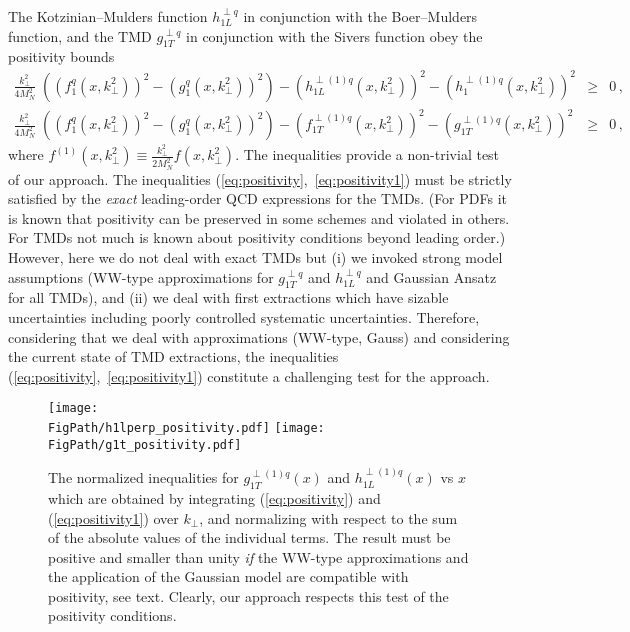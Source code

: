 \documentclass[a4paper,11pt]{article}
\newcommand{\ba}{\begin{eqnarray}}
\newcommand{\ea}{\end{eqnarray}}
\def\kperp{k_\perp}
\newcommand*{\FigPath}{./figs}%
\begin{document}
The Kotzinian--Mulders function $h^{\perp q}_{1L}$ in conjunction with
the Boer--Mulders function, and the TMD $g^{\perp q}_{1T}$ in conjunction
with the Sivers function obey the positivity bounds
\cite{Bacchetta:1999kz}
\begin{subequations}\ba
	\frac{\kperp^2}{4M_N^2}\;
	\left((f_{1}^{q}(x,\kperp^2))^2 -(g_{1}^{q}(x,\kperp^2))^2\right)
	- (h^{\perp(1)q}_{1L}(x,\kperp^2))^2
	- (h_{1}^{\perp(1)q}(x,\kperp^2))^2
	& \ge & 0\,, \quad \label{eq:positivity}\\
	\frac{\kperp^2}{4M_N^2}\;
	\left((f_{1}^{q}(x,\kperp^2))^2 -(g_{1}^{q}(x,\kperp^2))^2\right)
	- (f_{1T}^{\perp(1)q}(x,\kperp^2))^2
	- (g^{\perp(1)q}_{1T}(x,\kperp^2))^2
	& \ge & 0\,, \quad \label{eq:positivity1}
\ea\end{subequations}
where $f^{(1)}(x,\kperp^2) \equiv \frac{\kperp^2}{2M_N^2} f(x,\kperp^2)$.
The inequalities provide a non-trivial test of our approach.
The inequalities (\ref{eq:positivity},~\ref{eq:positivity1})
must be strictly satisfied by the {\it exact} leading-order QCD
expressions for the TMDs.
(For PDFs it is known that positivity can be preserved in some
schemes and violated in others. For TMDs not much is
known about positivity conditions beyond leading order.)
However, here we do not deal with exact TMDs but (i) we invoked
strong model assumptions (WW-type approximations for $g^{\perp q}_{1T}$
and $h^{\perp q}_{1L}$ and Gaussian Ansatz for all TMDs), and (ii) we deal
with first extractions which have sizable uncertainties including
poorly controlled systematic uncertainties.
Therefore, considering that we deal with approximations
(WW-type, Gauss) and considering the current state of TMD extractions,
the inequalities (\ref{eq:positivity},~\ref{eq:positivity1}) constitute
a challenging test for the approach.

\begin{figure}[b!]
\centering
\texttt{[image: \\FigPath/h1lperp\_positivity.pdf]} \quad
\texttt{[image: \\FigPath/g1t\_positivity.pdf]}
	\caption{\label{h1l_pos}
	The normalized inequalities for $g^{\perp(1)q}_{1T}(x)$ and
	$h^{\perp(1)q}_{1L}(x)$ vs $x$ which are obtained by integrating
	(\ref{eq:positivity}) and (\ref{eq:positivity1}) over $\kperp$,
	and normalizing with respect to the sum of the absolute
	values of the individual terms. The result must be positive and
	smaller than unity {\it if} the WW-type approximations
	and the application of the Gaussian model are compatible
	with positivity, see text. Clearly, our approach respects
	this test of the positivity conditions.}
\end{figure}
\end{document}
